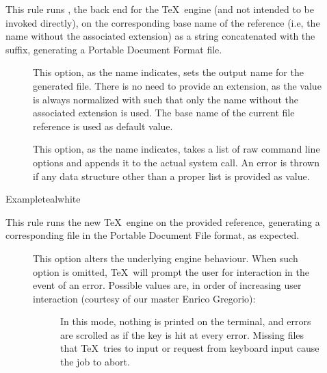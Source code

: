 \begin{description}
\item[] This rule runs , the back end for the  \TeX\ engine (and not intended to be invoked directly), on the corresponding base name of the  reference (i.e, the name without the associated extension) as a string concatenated with the  suffix, generating a Portable Document Format  file.

\begin{description}
\item[] This option, as the name indicates, sets the output name for the generated  file. There is no need to provide an extension, as the value is always normalized with  such that only the name without the associated extension is used. The base name of the current file reference is used as default value.

\item[] This option, as the name indicates, takes a list of raw command line options and appends it to the actual system call. An error is thrown if any data structure other than a proper list is provided as value.
\end{description}

\begin{codebox}{Example}{teal}{\icnote}{white}
\end{codebox}

\item[] This rule runs the new  \TeX\ engine on the provided  reference, generating a corresponding file in the Portable Document File format, as expected.

\begin{description}
\item[] This option alters the underlying engine behaviour. When such option is omitted, \TeX\ will prompt the user for interaction in the event of an error. Possible values are, in order of increasing user interaction (courtesy of our master Enrico Gregorio):

\begin{description}
\item[] In this mode, nothing is printed on the terminal, and errors are scrolled as if the  key is hit at every error. Missing files that \TeX\ tries to input or request from keyboard input cause the job to abort.


\end{description}
\end{description}
\end{description}
